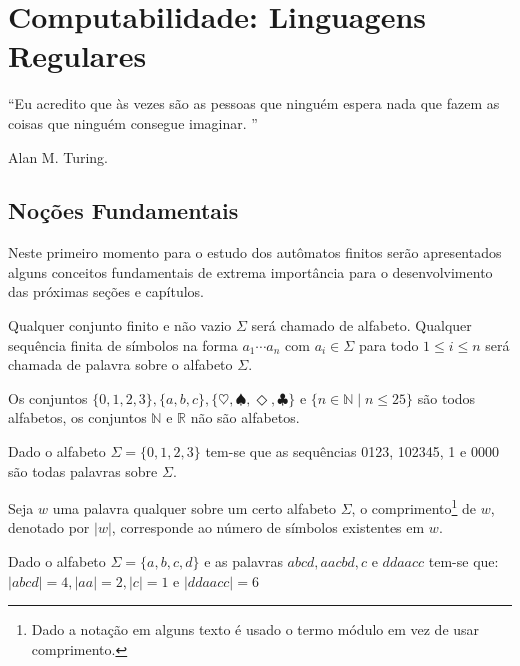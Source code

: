 \chapter{Computabilidade: Linguagens Regulares}\label{cap:LRegulares}

\epigraph{``Eu acredito que às vezes são as pessoas que ninguém espera nada que fazem as coisas que ninguém consegue imaginar. ''}{Alan M. Turing.}
 
\section{Noções Fundamentais}
 
Neste primeiro momento para o estudo dos autômatos finitos serão apresentados alguns conceitos fundamentais de extrema importância para o desenvolvimento das próximas seções e capítulos.

\begin{definition}\label{def:AlfabetoPalavra}
	\cite{valdi2016master} Qualquer conjunto finito e não vazio $\Sigma$ será chamado de alfabeto. Qualquer sequência finita de símbolos na forma $a_1\cdots a_n$ com $a_i \in \Sigma$ para todo $1 \leq i \leq n$ será chamada de palavra sobre o alfabeto $\Sigma$.
\end{definition}


\begin{exem}
	Os conjuntos $\{0, 1, 2, 3\}, \{a, b, c\}, \{\heartsuit,\spadesuit, \Diamond, \clubsuit\}$ e $\{n \in \mathbb{N} \mid n \leq 25\}$ são todos alfabetos, os conjuntos $\mathbb{N}$ e $\mathbb{R}$ não são alfabetos.
\end{exem}

\begin{exem}
	Dado o alfabeto $\Sigma = \{0, 1, 2, 3\}$ tem-se que as sequências 0123, 102345, 1 e 0000 são todas palavras sobre $\Sigma$.
\end{exem}

\begin{definition}\label{def:ComprimentoPalavra}
	Seja $w$ uma palavra qualquer sobre um certo alfabeto $\Sigma$, o comprimento\footnote{Dado a notação em alguns texto é usado o termo módulo em vez de usar comprimento.} de $w$, denotado por $|w|$, corresponde ao número de símbolos existentes em $w$.
\end{definition}

\begin{exem}
	Dado o alfabeto $\Sigma = \{a, b, c, d\}$ e as palavras $abcd, aacbd, c$ e $ddaacc$ tem-se que: $|abcd| = 4, |aa| = 2, |c| = 1$ e $|ddaacc| = 6$
\end{exem}

